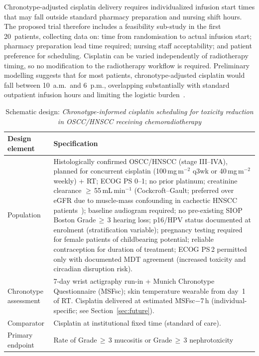 \documentclass[preprint,review,12pt]{elsarticle}
\renewcommand{\arraystretch}{1.18}
\newenvironment{compactsidewaystable}
  {\begin{table}\centering\scriptsize
   \setlength{\tabcolsep}{3pt}\renewcommand{\arraystretch}{1.08}}
  {\end{table}}
\begin{document}
Chronotype-adjusted cisplatin delivery requires individualized
infusion start times that may fall outside standard pharmacy
preparation and nursing shift hours.  The proposed trial therefore
includes a feasibility sub-study in the first 20~patients, collecting
data on: time from randomisation to actual infusion start; pharmacy
preparation lead time required; nursing staff acceptability; and
patient preference for scheduling.  Cisplatin can be varied
independently of radiotherapy timing, so no modification to the
radiotherapy workflow is required.  Preliminary modelling suggests
that for most patients, chronotype-adjusted cisplatin would fall
between 10~a.m.\ and 6~p.m., overlapping substantially with standard
outpatient infusion hours and limiting the logistic burden~\cite{Levi2020,
Innominato2012}.

\begin{compactsidewaystable}
\caption{Schematic design: \emph{Chronotype-informed cisplatin scheduling
  for toxicity reduction in OSCC/HNSCC receiving chemoradiotherapy}}
\label{tab:trial}
\begin{tabularx}{0.95\textheight}{L{3.0cm} Y}
\toprule
\textbf{Design element} & \textbf{Specification} \\
\midrule
Population &
  Histologically confirmed OSCC/HNSCC (stage III--IVA), planned for
  concurrent cisplatin (100\,mg\,m$^{-2}$ q3wk or 40\,mg\,m$^{-2}$ weekly)
  + RT; ECOG PS 0--1; no prior platinum; creatinine clearance
  $\geq$\,55\,mL\,min$^{-1}$ (Cockcroft--Gault; preferred over eGFR due
  to muscle-mass confounding in cachectic HNSCC patients~\cite{Strojan2016});
  baseline audiogram required; no pre-existing SIOP Boston Grade\,$\geq$\,3
  hearing loss; p16/HPV status documented at enrolment (stratification
  variable); pregnancy testing required for female patients of childbearing
  potential; reliable contraception for duration of treatment; ECOG PS\,2
  permitted only with documented MDT agreement (increased toxicity and
  circadian disruption risk). \\
\addlinespace
Chronotype assessment &
  7-day wrist actigraphy run-in + Munich Chronotype Questionnaire (MSFsc);
  skin temperature wearable from day~1 of RT. Cisplatin delivered at
  estimated MSFsc$-$7\,h (individual-specific;
  see Section~\ref{sec:future}). \\
\addlinespace
Comparator &
  Cisplatin at institutional fixed time (standard of care). \\
\addlinespace
Primary endpoint &
  Rate of Grade\,$\geq$\,3 mucositis or Grade\,$\geq$\,3 nephrotoxicity

\end{tabularx}
\end{compactsidewaystable}
\end{document}
